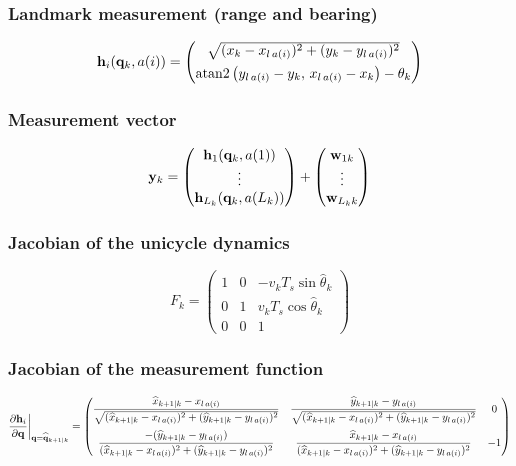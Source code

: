 \subsubsection{Landmark measurement (range and bearing)}
\begin{equation*}
    \mathbf h_i({\mathbf q}_k,a(i))=\begin{pmatrix}
        \sqrt{(x_k-x_{l\,a(i)})^2+(y_k-y_{l\,a(i)})^2}\\[1ex]
        \text{atan2}\left(y_{l\,a(i)}-y_k,\,x_{l\,a(i)}-x_k\right)-\theta_k
    \end{pmatrix}
\end{equation*}

\subsubsection{Measurement vector}
\begin{equation*}
    \mathbf y_k=\begin{pmatrix}\mathbf h_1({\mathbf q}_k,a(1))\\\vdots\\\mathbf h_{L_k}({\mathbf q}_k,a(L_k))\end{pmatrix}+\begin{pmatrix}\mathbf w_{1k}\\\vdots\\\mathbf w_{L_kk}\end{pmatrix}
\end{equation*}

\subsubsection{Jacobian of the unicycle dynamics}
\begin{equation*}
    F_k=\begin{pmatrix}1&0&-v_kT_s\sin\widehat\theta_k\\0&1&v_kT_s\cos\widehat\theta_k\\0&0&1\end{pmatrix}
\end{equation*}

\subsubsection{Jacobian of the measurement function}
\begin{equation*}
    \frac{\partial\mathbf h_i}{\partial{\mathbf q}}\bigg|_{{\mathbf q}=\widehat{{\mathbf q}}_{k+1|k}}=
    \begin{pmatrix}
    \dfrac{\widehat x_{k+1|k}-x_{l\,a(i)}}{\sqrt{(\widehat x_{k+1|k}-x_{l\,a(i)})^2+(\widehat y_{k+1|k}-y_{l\,a(i)})^2}}&
    \dfrac{\widehat y_{k+1|k}-y_{l\,a(i)}}{\sqrt{(\widehat x_{k+1|k}-x_{l\,a(i)})^2+(\widehat y_{k+1|k}-y_{l\,a(i)})^2}}&0\\[3ex]
    \dfrac{-(\widehat y_{k+1|k}-y_{l\,a(i)})}{(\widehat x_{k+1|k}-x_{l\,a(i)})^2+(\widehat y_{k+1|k}-y_{l\,a(i)})^2}&
    \dfrac{\widehat x_{k+1|k}-x_{l\,a(i)}}{(\widehat x_{k+1|k}-x_{l\,a(i)})^2+(\widehat y_{k+1|k}-y_{l\,a(i)})^2}&-1
    \end{pmatrix}
\end{equation*}

